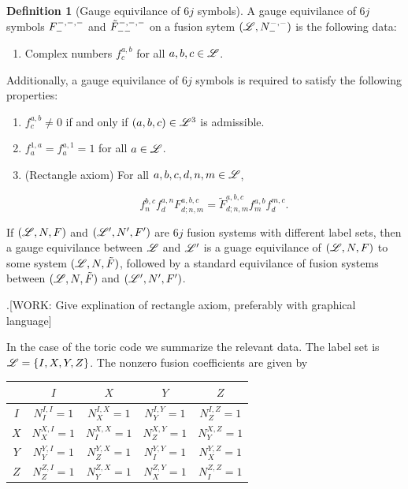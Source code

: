 \documentclass{article}
\theoremstyle{definition}
\newtheorem*{definition}{Definition}
\numberwithin{figure}{section}
\begin{document}
\begin{definition}[Gauge equivilance of $6j$ symbols] A gauge equivilance of $6j$ symbols $F^{\--,\--,\--}_{\--}$ and $\tilde{F}^{\--,\--,\--}_{--}$ on a fusion sytem $(\mathscr{L},N^{\--,\--}_{\--})$ is the following data:

\begin{enumerate}
\item Complex numbers $f^{a,b}_{c}$ for all $a,b,c\in \mathscr{L}$.
\end{enumerate}

Additionally, a gauge equivilance of $6j$ symbols is required to satisfy the following properties:

\begin{enumerate}
\item $f^{a,b}_{c}\neq 0$ if and only if $(a,b,c)\in \mathscr{L}^3$ is admissible.
\item $f^{1,a}_{a}=f^{a,1}_{a}=1$ for all $a\in \mathscr{L}$.
\item (Rectangle axiom) For all $a,b,c,d,n,m\in \mathscr{L}$,

$$f_n^{b,c}f^{a,n}_{d}F^{a,b,c}_{d;n,m}=\tilde{F}^{a,b,c}_{d;n,m}f^{a,b}_{m}f^{m,c}_{d}.$$
\end{enumerate}
\raggedleft\qedsymbol{}
\end{definition}

If $(\mathscr{L},N,F)$ and $(\mathscr{L}',N',F')$ are $6j$ fusion systems with different label sets, then a gauge equivilance between $\mathscr{L}$ and $\mathscr{L}'$ is a guage equivilance of $(\mathscr{L},N,F)$ to some system $(\mathscr{L},N,\tilde{F})$, followed by a standard equivilance of fusion systems between $(\mathscr{L},N,\tilde{F})$ and $(\mathscr{L}',N',F')$.

.[WORK: Give explination of rectangle axiom, preferably with graphical language]

In the case of the toric code we summarize the relevant data. The label set is $\mathscr{L}=\{I,X,Y,Z\}$. The nonzero fusion coefficients are given by

\begin{center}
\begin{tabular}{c |c |c |c |c} 
  & $I$ & $X$ & $Y$ & $Z$ \\ [0.5ex] 
 \hline
 $I$ & $N^{I,I}_{I}=1$ & $N^{I,X}_{X}=1$ & $N^{I,Y}_{Y}=1$ & $N^{I,Z}_{Z}=1$ \\ 
 \hline
 $X$ & $N^{X,I}_{X}=1$ & $N^{X,X}_{I}=1$ & $N^{X,Y}_{Z}=1$ & $N^{X,Z}_{Y}=1$ \\
 \hline
 $Y$ & $N^{Y,I}_{Y}=1$ & $N^{Y,X}_{Z}=1$ & $N^{Y,Y}_{I}=1$ & $N^{Y,Z}_{X}=1$ \\
 \hline
 $Z$ & $N^{Z,I}_{Z}=1$ & $N^{Z,X}_{Y}=1$ & $N^{Z,Y}_X=1$ & $N^{Z,Z}_I=1$
\end{tabular}
\end{center}
\end{document}
